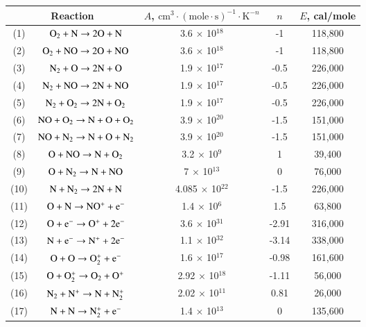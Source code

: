 \documentclass{warpdoc}
\renewcommand{\fontsizetable}{\footnotesize\scalefont{0.9}}
\begin{document}
%
\begin{table}[t]
\fontsizetable
\begin{center}
\begin{threeparttable}
\begin{tabular}{ccccc} 
\toprule
\multicolumn{2}{c}{Reaction} & $A$, $\textrm{cm}^3\cdot(\textrm{mole}\cdot \textrm{s})^{-1}\cdot \textrm{K}^{-n}$ & $n$ & $E$, cal/mole  \\ 
\midrule
(1) & $\rm O_2 + N \rightarrow 2O+N$ & 3.6 $\times$ 10$^{18}$  & -1 & 118,800 \\
(2) & $\rm O_2 + NO \rightarrow 2O+NO$ & 3.6 $\times$ 10$^{18}$ & -1 & 118,800 \\
(3) & $\rm N_2 + O \rightarrow 2N+O$ & 1.9 $\times$ 10$^{17}$ & -0.5 & 226,000 \\
(4) & $\rm N_2 + NO \rightarrow 2N+NO$ & 1.9 $\times$ 10$^{17}$ & -0.5 & 226,000 \\
(5) & $\rm N_2 + O_2 \rightarrow 2N+O_2$ & 1.9 $\times$ 10$^{17}$ & -0.5 & 226,000 \\
(6) & $\rm NO + O_2 \rightarrow N+O+O_2$ & 3.9 $\times$ 10$^{20}$ & -1.5 & 151,000 \\
(7) & $\rm NO + N_2 \rightarrow N+O+N_2$ & 3.9 $\times$ 10$^{20}$ & -1.5 & 151,000 \\
(8) & $\rm O + NO \rightarrow N+O_2$ & 3.2 $\times$ 10$^{9}$ & 1 & 39,400 \\
(9) & $\rm O + N_2 \rightarrow N+NO$ & 7 $\times$ 10$^{13}$ & 0 & 76,000 \\
(10) & $\rm N + N_2 \rightarrow 2N+N$ & 4.085 $\times$ 10$^{22}$ & -1.5 & 226,000 \\
(11) & $\rm O + N \rightarrow NO^{+}+e^{-}$ & 1.4 $\times$ 10$^{6}$ & 1.5 & 63,800 \\
(12) & $\rm O + e^- \rightarrow O^++2e^-$ & 3.6 $\times$ 10$^{31}$ & -2.91 & 316,000 \\
(13) & $\rm N + e^- \rightarrow N^++2e^-$ & 1.1 $\times$ 10$^{32}$ & -3.14 & 338,000 \\
(14) & $\rm O + O \rightarrow O_2^{+}+e^-$ & 1.6 $\times$ 10$^{17}$ & -0.98 & 161,600 \\
(15) & $\rm O + O_2^+ \rightarrow O_2+O^+$ & 2.92 $\times$ 10$^{18}$ & -1.11 & 56,000 \\
(16) & $\rm N_2 + N^+ \rightarrow N+N_2^{+}$ & 2.02 $\times$ 10$^{11}$ & 0.81 & 26,000 \\
(17) & $\rm N + N \rightarrow N_2^{+} + e^-$ & 1.4 $\times$ 10$^{13}$ & 0 & 135,600 \\

\end{tabular}
\end{threeparttable}
\end{center}
\end{table}
\end{document}
